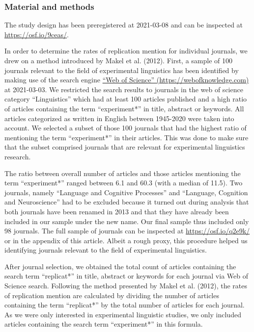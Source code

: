 \documentclass[]{elsarticle} %
\begin{document}
\hypertarget{material-and-methods}{%
\subsubsection{Material and methods}\label{material-and-methods}}

The study design has been preregistered at 2021-03-08 and can be
inspected at \url{https://osf.io/9ceas/}.

In order to determine the rates of replication mention for individual
journals, we drew on a method introduced by Makel et al. (2012). First,
a sample of 100 journals relevant to the field of experimental
linguistics has been identified by making use of the search engine
\href{https://webofknowledge.com}{``Web of Science''
(https://webofknowledge.com)} at 2021-03-03. We restricted the search
results to journals in the web of science category ``Linguistics'' which
had at least 100 articles published and a high ratio of articles
containing the term ``experiment*'' in title, abstract or keywords. All
articles categorized as written in English between 1945-2020 were taken
into account. We selected a subset of those 100 journals that had the
highest ratio of mentioning the term ``experiment*'' in their articles.
This was done to make sure that the subset comprised journals that are
relevant for experimental linguistics research.

The ratio between overall number of articles and those articles
mentioning the term ``experiment*'' ranged between 6.1 and 60.3 (with a
median of 11.5). Two journals, namely ``Language and Cognitive
Processes'' and ``Language, Cognition and Neuroscience'' had to be
excluded because it turned out during analysis that both journals have
been renamed in 2013 and that they have already been included in our
sample under the new name. Our final sample thus included only 98
journals. The full sample of journals can be inspected at
\url{https://osf.io/q2e9k/} or in the appendix of this article. Albeit a
rough proxy, this procedure helped us identifying journals relevant to
the field of experimental linguistics.

After journal selection, we obtained the total count of articles
containing the search term ``replicat*'' in title, abstract or keywords
for each journal via Web of Science search. Following the method
presented by Makel et al. (2012), the rates of replication mention are
calculated by dividing the number of articles containing the term
``replicat*'' by the total number of articles for each journal. As we
were only interested in experimental linguistic studies, we only
included articles containing the search term ``experiment*'' in this
formula.
\end{document}
